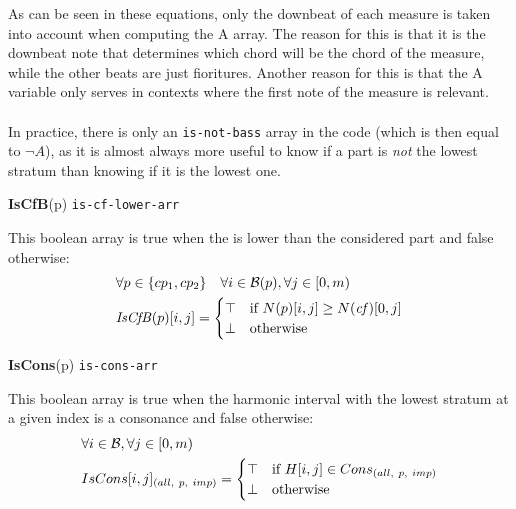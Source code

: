 As can be seen in these equations, only the downbeat of each measure is taken into account when computing the A array. The reason for this is that it is the downbeat note that determines which chord will be the chord of the measure, while the other beats are just fioritures. Another reason for this is that the A variable only serves in contexts where the first note of the measure is relevant.

\paragraph{}
In practice, there is only an \texttt{is-not-bass} array in the code (which is then equal to $\neg A$), as it is almost always more useful to know if a part is \textit{not} the lowest stratum than knowing if it is the lowest one. 

\vspace{.5cm} \noindent \textbf{IsCfB}(p) \hspace{.cm} \texttt{is-cf-lower-arr} \label{is-cf-b}

This boolean array is true when the \cfs is lower than the considered part and false otherwise:
\begin{equation}
    \begin{aligned}
    &\forall p \in \{cp_1, cp_2\} \quad \forall i \in \mathcal{B}(p), \forall j \in [0, m)\\
    & \mathit{IsCfB}(p)[i, j] =
    \begin{cases}
        \top & \text{if } N(p)[i, j] \geq N(\mathit{cf})[0,j] \\
        \bot & \text{otherwise}
    \end{cases}
    \end{aligned}
\end{equation}

\vspace{.5cm} \noindent \textbf{IsCons}(p) \hspace{.cm} \texttt{is-cons-arr} \label{is-cons}

This boolean array is true when the harmonic interval with the lowest stratum at a given index is a consonance and false otherwise:
\begin{equation}
    \begin{aligned}
    &\forall i \in \mathcal{B}, \forall j \in [0, m)\\
    &IsCons[i, j]_{(all,\ p,\ imp)} =
    \begin{cases}
        \top & \text{if } H[i, j] \in Cons_{(all,\ p,\ imp)}\\
        \bot & \text{otherwise}
    \end{cases}
    \end{aligned}
\end{equation}